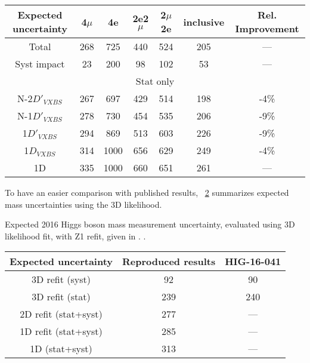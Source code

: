 \begin{table}[ht]	
\begin{center}
    \begin{tabular}{ccccccc}
    \hline			
    Expected uncertainty	&	4$\mu$	&	4e	&	2e2$\mu$	&2$\mu$2e	& inclusive & Rel. Improvement \\
    \hline			
    Total	&	268	&	725	&	440	&	524	&	205	&	---\\
    \hline
    Syst impact	&	23	&	200	&	98	&	102	&	53	&	---\\
    \hline
    \multicolumn{7}{c}{Stat only}\\
    \hline
    N-2$D'_{VXBS}$	&	267	&	697	&	429	&	514	&	198	&	-4\%	 \\
    N-1$D'_{VXBS}$	&	278	&	730	&	454	&	535	&	206 &	-9\%	 \\
    1$D'_{VXBS}$	&	294	&	869	&	513	&	603	&	226	&	-9\%	 \\
    1$D_{VXBS}$	&	314	&	1000	&	656	&	629	&	249	&	-4\%	 \\
    1D	&	335	&	1000	&	660	&	651	&	261	&	---	 \\
    \hline			
    \end{tabular}
    \label{table:2D_refit_result_finals_2016}
\end{center}
\end{table}
To have an easier comparison with published results, \tablename~\ref{table:old_method_result_finals_2016} summarizes expected mass uncertainties using the 3D likelihood.
\begin{table}[ht]	
\begin{center}
    \topcaption
    {Expected 2016 Higgs boson mass measurement uncertainty, evaluated using 3D likelihood fit, with
    Z1 refit, given in \MeV. {\color{red}{Obtained scaling to full 2016 luminosity, 2016 post-VFP samples}}.}
    \begin{tabular}{ccc}
    \hline			
    Expected uncertainty	&	Reproduced results & HIG-16-041	\\
    \hline			
    3D refit (syst)	&	92	&	90 \\
    3D refit (stat)	&	239	&	240	\\	
    \hline			
    \hline			
    2D refit (stat+syst)	&	277	&	---	\\
    1D refit (stat+syst)	&	285	&	---	\\
    1D  (stat+syst)	&	313	&	---	\\
    \hline			
    \end{tabular}
    \label{table:old_method_result_finals_2016}
\end{center}
\end{table}



